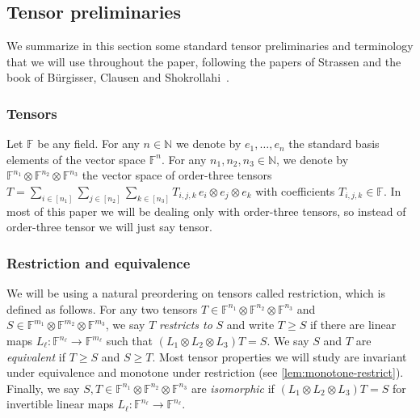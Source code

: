 \documentclass{daj}
\newcommand{\FF}{\mathbb{F}}
\newcommand{\NN}{\mathbb{N}}
\begin{document}
%

%

%
%
%

%

%
%
%

%




%
%
%
%
%
%
%
%
%
%
%
%
%
%
%
%
%
%
%
%
%

%

%
%
%
%
%
%
%
%
%
%
%
%
%
%
%
%
%

%
%
%
%
%
%
%
%
%
%
%
%
%
%
%
%
%
%

%



%

%

%

%
%
%
%
%

%

\subsection{Tensor preliminaries}\label{subsec:prelim}

We summarize in this section some standard tensor preliminaries and terminology that we will use throughout the paper, following the papers of Strassen \cite{MR882307,strassen1988asymptotic,strassen1991degeneration} and the book of Bürgisser, Clausen and Shokrollahi~\cite{burgisser1997algebraic}.


\subsubsection*{Tensors}
%
%
Let $\FF$ be any field. For any $n \in \NN$ we denote by $e_1, \ldots, e_n$ the standard basis elements of the vector space $\FF^n$. For any $n_1, n_2, n_3 \in \NN$, we denote by $\FF^{n_1} \otimes \FF^{n_2} \otimes \FF^{n_3}$ the vector space of order-three tensors $T = \sum_{i \in [n_1]} \sum_{j \in [n_2]} \sum_{k \in [n_3]} T_{i,j,k}\, e_i \otimes e_j \otimes e_k$ with coefficients $T_{i,j,k} \in \FF$. In most of this paper we will be dealing only with order-three tensors, so instead of order-three tensor we will just say tensor. 

%
\subsubsection*{Restriction and equivalence} 
We will be using a natural preordering on tensors called restriction, which is defined as follows. For any two tensors $T \in \FF^{n_1} \otimes \FF^{n_2} \otimes \FF^{n_3}$ and $S \in \FF^{m_1} \otimes \FF^{m_2} \otimes \FF^{m_3}$, we say $T$ \emph{restricts to} $S$ and write $T \geq S$ if there are linear maps $L_\ell : \FF^{n_\ell} \to \FF^{m_\ell}$ such that $(L_1 \otimes L_2 \otimes L_3)T = S$. We say $S$ and $T$ are \emph{equivalent} if $T \geq S$ and $S \geq T$. Most tensor properties we will study are invariant under equivalence and monotone under restriction (see \autoref{lem:monotone-restrict}). Finally, we say $S, T \in \FF^{n_1} \otimes \FF^{n_2} \otimes \FF^{n_3}$ are \emph{isomorphic} if $(L_1 \otimes L_2 \otimes L_3)T = S$ for invertible linear maps $L_\ell : \FF^{n_\ell} \to \FF^{n_\ell}$.
%
\end{document}
